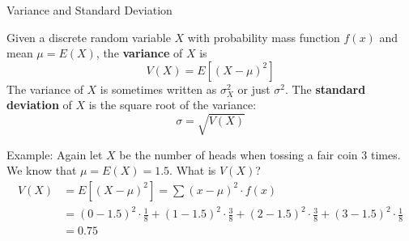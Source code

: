 \documentclass[xcolor=table]{beamer}
\renewcommand{\emph}{\textbf}
\begin{document}
%

\begin{frame}{Variance and Standard Deviation}
\vspace{-.1cm}
\begin{definition}
Given a discrete random variable $X$ with probability mass function $f(x)$ and mean $\mu=E(X)$, the \emph{variance} of $X$ is
$$V(X)=E[(X-\mu)^2]$$ %
The variance of $X$ is sometimes written as $\sigma_X^2$ or just $\sigma^2$.
The \emph{standard deviation} of $X$ is the square root of the variance:
$$\sigma = \sqrt{V(X)}$$
\end{definition}

\pause Example: Again let $X$ be the number of heads when tossing a fair coin 3 times. We know that $\mu=E(X)=1.5$. What is $V(X)$?
\pause \begin{align*}
V(X)&=E[(X-\mu)^2] = \sum (x-\mu)^2 \cdot f(x) \\
&= (0-1.5)^2\cdot\frac18 + (1-1.5)^2\cdot\frac38+(2-1.5)^2\cdot\frac38+(3-1.5)^2\cdot\frac18\\
&= %
0.75
\end{align*}
\end{frame}
\end{document}
